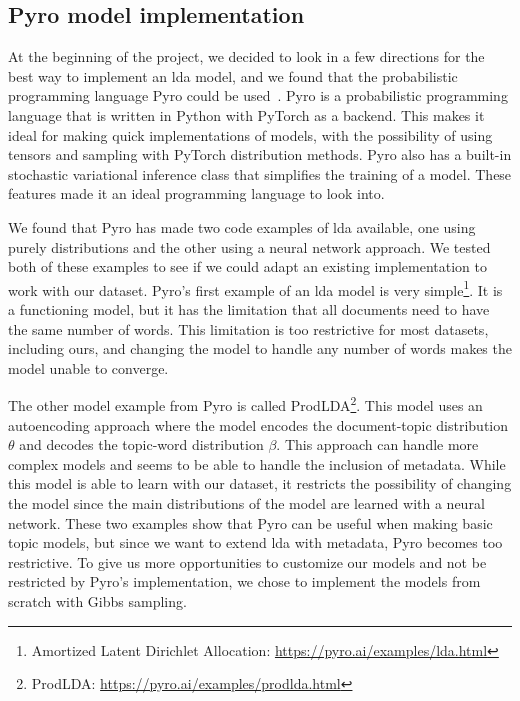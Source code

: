 \subsection{Pyro model implementation}
At the beginning of the project, we decided to look in a few directions for the best way to implement an \gls{lda} model, and we found that the probabilistic programming language Pyro could be used~\cite{bingham2019pyro}.
Pyro is a probabilistic programming language that is written in Python with PyTorch as a backend.
This makes it ideal for making quick implementations of models, with the possibility of using tensors and sampling with PyTorch distribution methods.
Pyro also has a built-in stochastic variational inference class that simplifies the training of a model.
These features made it an ideal programming language to look into.

We found that Pyro has made two code examples of \gls{lda} available, one using purely distributions and the other using a neural network approach.
We tested both of these examples to see if we could adapt an existing implementation to work with our dataset.
Pyro's first example of an \gls{lda} model is very simple\footnote{Amortized Latent Dirichlet Allocation: \url{https://pyro.ai/examples/lda.html}}.
It is a functioning model, but it has the limitation that all documents need to have the same number of words.
This limitation is too restrictive for most datasets, including ours, and changing the model to handle any number of words makes the model unable to converge.

The other model example from Pyro is called ProdLDA\footnote{ProdLDA: \url{https://pyro.ai/examples/prodlda.html}}.
This model uses an autoencoding approach where the model encodes the document-topic distribution $\theta$ and decodes the topic-word distribution $\beta$.
This approach can handle more complex models and seems to be able to handle the inclusion of metadata.
While this model is able to learn with our dataset, it restricts the possibility of changing the model since the main distributions of the model are learned with a neural network.
These two examples show that Pyro can be useful when making basic topic models, but since we want to extend \gls{lda} with metadata, Pyro becomes too restrictive.
To give us more opportunities to customize our models and not be restricted by Pyro's implementation, we chose to implement the models from scratch with Gibbs sampling.
